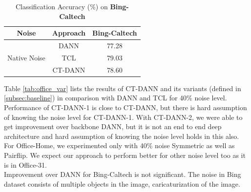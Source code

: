 \begin{center}
\begin{table}[h]
    \centering
    \caption{Classification Accuracy (\%) on \textbf{Office-Home} with 40\% Pairflip noise levels}
    \end{table}
\end{center}
\vspace{-1.2cm}

\begin{center}
\begin{table}[h]
    \centering
    \begin{tabular}{|c|c|c|}
    \hline
    {Noise} & {Approach} & {Bing-Caltech}\\
    \hline
    \multirow{3}{6em}{Native Noise} & DANN & 77.28\\
    & TCL & 79.03\\
    & CT-DANN & 78.60\\
    \hline
    \end{tabular}
    \caption{Classification Accuracy (\%) on \textbf{Bing-Caltech}}
    \label{tab:bing-cal}
    \end{table}
\end{center}
\vspace{-1.0cm}
Table \ref{tab:office_var} lists the results of CT-DANN and its variants (defined in \ref{subsec:baseline}) in comparison with DANN and TCL for 40\% noise level. Performance of CT-DANN-1 is close to CT-DANN, but there is hard assumption of knowing the noise level for CT-DANN-1. With CT-DANN-2, we were able to get improvement over backbone DANN, but it is not an end to end deep architecture and hard assumption of knowing the noise level holds in this also.\\
For Office-Home, we experimented only with 40\% noise Symmetric as well as Pairflip. We expect our approach to perform better for other noise level too as it is in Office-31.\\
Improvement over DANN for Bing-Caltech is not significant. The noise in Bing dataset consists of multiple objects in the image, caricaturization of the image.

